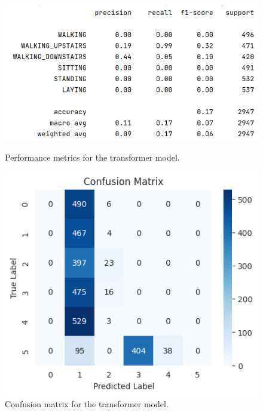 \begin{figure}[ht]
    \centering
    \begin{minipage}{0.45\textwidth}
        \centering
        \includegraphics[width=\textwidth]{./img/transformer/performance-metrics}
        \caption{Performance metrics for the transformer model.}
        \label{fig:transformer-performance-metrics}
    \end{minipage}\hfill
    \begin{minipage}{0.45\textwidth}
        \centering
        \includegraphics[width=\textwidth]{./img/transformer/confusion-matrix}
        \caption{Confusion matrix for the transformer model.}
        \label{fig:transformer-confusion-matrix}
    \end{minipage}
\end{figure}

